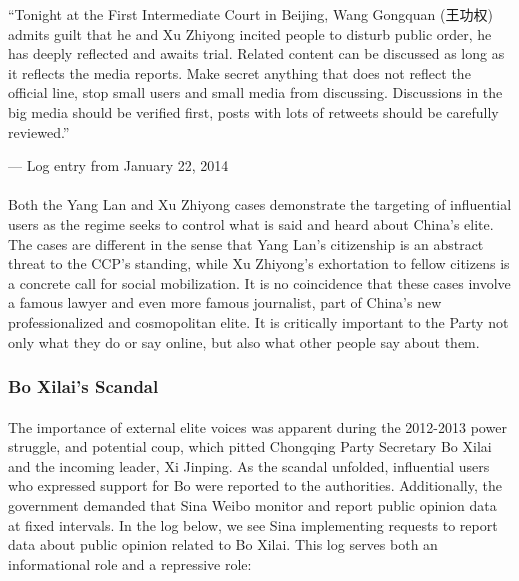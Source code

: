 \documentclass[12pt]{article}
\begin{document}
\begin{CJK*}{UTF8}{gbsn}
{
\epigraph{``Tonight at the First Intermediate Court in Beijing, Wang Gongquan (王功权) admits guilt that he and Xu Zhiyong incited people to disturb public order, he has deeply reflected and awaits trial. Related content can be discussed as long as it reflects the media reports. Make secret anything that does not reflect the official line, stop small users and small media from discussing. Discussions in the big media should be verified first, posts with lots of retweets should be carefully reviewed.''\footnotemark\newline}{--- Log entry from January 22, 2014}}

\paragraph{} Both the Yang Lan and Xu Zhiyong cases demonstrate the targeting of influential users as the regime seeks to control what is said and heard about China's elite. The cases are different in the sense that Yang Lan's citizenship is an abstract threat to the CCP's standing, while Xu Zhiyong's exhortation to fellow citizens is a concrete call for social mobilization. It is no coincidence that these cases involve a famous lawyer and even more famous journalist, part of China's new professionalized and cosmopolitan elite. It is critically important to the Party not only what they do or say online, but also what other people say about them. 

\subsubsection{Bo Xilai's Scandal}

\paragraph{} The importance of external elite voices was apparent during the 2012-2013 power struggle, and potential coup, which pitted Chongqing Party Secretary Bo Xilai and the incoming leader, Xi Jinping. As the scandal unfolded, influential users who expressed support for Bo were reported to the authorities. Additionally, the government demanded that Sina Weibo monitor and report public opinion data at fixed intervals. In the log below, we see Sina implementing requests to report data about public opinion related to Bo Xilai. This log serves both an informational role and a repressive role:


\end{CJK*}
\end{document}
